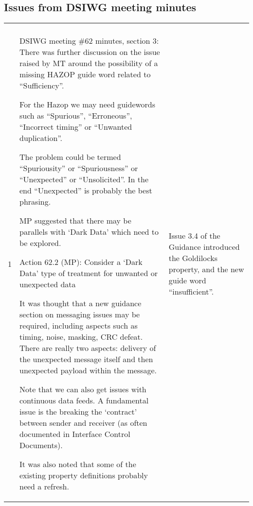 \clearpage
\subsection{Issues from DSIWG meeting minutes}
\begin{longtable}[H]
{|L{}|L{}|L{}|}
\hline
{} &  & \\
\hline
  \endfirsthead
  \hline{} &  & \\\hline
  \endhead
  \endfoot
  \endlastfoot

  1 &
  DSIWG meeting \#62 minutes, section 3:
  There was further discussion on the issue raised by MT around the possibility of a missing HAZOP
  guide word related to “Sufficiency”.
  
  For the Hazop we may need guidewords such as “Spurious”, “Erroneous”, “Incorrect timing” or
  “Unwanted duplication”.
  
  The problem could be termed “Spuriousity” or “Spuriousness” or “Unexpected” or “Unsolicited”. In
  the end “Unexpected” is probably the best phrasing.
  
  MP suggested that there may be parallels with ‘Dark Data’ which need to be explored.
  
  Action 62.2 (MP): Consider a ‘Dark Data’ type of treatment for unwanted or unexpected data
  
  It was thought that a new guidance section on messaging issues may be required, including aspects
  such as timing, noise, masking, CRC defeat. There are really two aspects: delivery of the unexpected
  message itself and then unexpected payload within the message.
  
  Note that we can also get issues with continuous data feeds. A fundamental issue is the breaking the
  ‘contract’ between sender and receiver (as often documented in Interface Control Documents).
  
  It was also noted that some of the existing property definitions probably need a refresh.&
  Issue 3.4 of the Guidance introduced the Goldilocks property, and the new guide word ``insufficient''.


\end{longtable}
